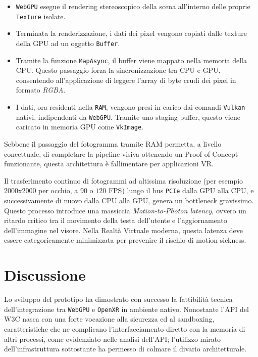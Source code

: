 \documentclass[a4paper, 11pt, twoside]{report}
\begin{document}
\begin{itemize}
    \item \texttt{WebGPU} esegue il rendering stereoscopico della scena all'interno delle proprie \texttt{Texture}
        isolate.
    \item Terminata la renderizzazione, i dati dei pixel vengono copiati dalle texture della GPU ad un oggetto
        \texttt{Buffer}.
    \item Tramite la funzione \texttt{MapAsync}, il buffer viene mappato nella memoria della CPU. Questo passaggio
        forza la sincronizzazione tra CPU e GPU, consentendo all'applicazione di leggere l'array di byte crudi dei pixel
        in formato \textit{RGBA}.
    \item I dati, ora residenti nella \texttt{RAM}, vengono presi in carico dai comandi \texttt{\gls{Vulkan}} nativi,
        indipendenti da \texttt{WebGPU}. Tramite uno staging buffer, questo viene caricato in memoria GPU come
        \texttt{VkImage}.
\end{itemize}

Sebbene il passaggio del fotogramma tramite RAM permetta, a livello concettuale, di completare la pipeline visiva
ottenendo un Proof of Concept funzionante, questa architettura è fallimentare per applicazioni VR.

Il trasferimento continuo di fotogrammi ad altissima risoluzione (per esempio $2000$x$2000$ per occhio, a $90$ o $120$
FPS) lungo il bus \texttt{PCIe} dalla GPU alla CPU, e successivamente di nuovo dalla CPU alla GPU, genera un bottleneck
gravissimo.
Questo processo introduce una massiccia \textit{Motion-to-Photon latency}, ovvero un ritardo critico tra il movimento
della testa dell'utente e l'aggiornamento dell'immagine nel visore.
Nella Realtà Virtuale moderna, questa latenza deve essere categoricamente minimizzata per prevenire il rischio di
motion sickness.

\section{Discussione}

Lo sviluppo del prototipo ha dimostrato con successo la fattibilità tecnica dell'integrazione tra \texttt{WebGPU} e
\texttt{\gls{OpenXR}} in ambiente nativo. Nonostante l'API del W3C nasca con una forte vocazione alla sicurezza ed al
sandboxing, caratteristiche che ne complicano l'interfacciamento diretto con la memoria di altri processi, come
evidenziato nelle analisi dell'API; l'utilizzo mirato dell'infrastruttura sottostante ha permesso di colmare il divario
architetturale.
\end{document}
